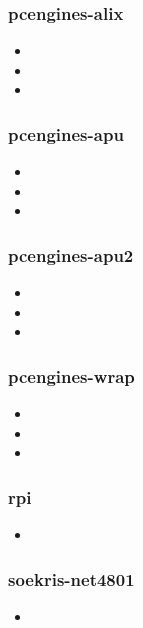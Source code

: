 \subsubsection{pcengines-alix}
\begin{itemize}
  \item {}
  \item {}
  \item {}
\end{itemize}

\subsubsection{pcengines-apu}
\begin{itemize}
  \item {}
  \item {}
  \item {}
\end{itemize}

\subsubsection{pcengines-apu2}
\begin{itemize}
  \item {}
  \item {}
  \item {}
\end{itemize}

\subsubsection{pcengines-wrap} 
\begin{itemize}
  \item {}
  \item {}
  \item {}
\end{itemize}

\subsubsection{rpi}
\begin{itemize}
  \item {}
\end{itemize}

\subsubsection{soekris-net4801}
\begin{itemize}
  \item {}
\end{itemize}

